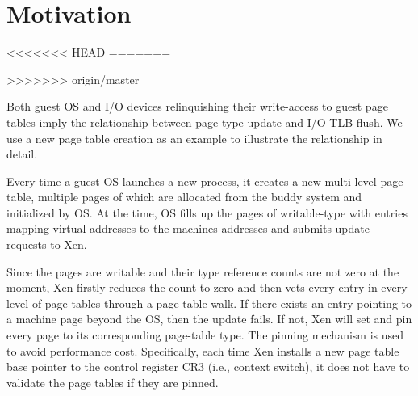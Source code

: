 \section{Motivation}
<<<<<<< HEAD
=======





>>>>>>> origin/master






Both guest OS and I/O devices relinquishing their write-access to guest page tables imply the relationship between page type update and I/O TLB flush. We use a new page table creation as an example to illustrate the relationship in detail.

Every time a guest OS launches a new process, it creates a new multi-level page table, multiple pages of which are allocated from the buddy system and initialized by OS. At the time, OS fills up the pages of writable-type with entries mapping virtual addresses to the machines addresses and submits update requests to Xen.

Since the pages are writable and their type reference counts are not zero at the moment, Xen firstly reduces the count to zero and then vets every entry in every level of page tables through a page table walk. If there exists an entry pointing to a machine page beyond the OS, then the update fails. If not, Xen will set and pin every page to its corresponding page-table type. The pinning mechanism is used to avoid performance cost. Specifically, each time Xen installs a new page table base pointer to the control register CR3 (i.e., context switch), it does not have to validate the page tables if they are pinned.

